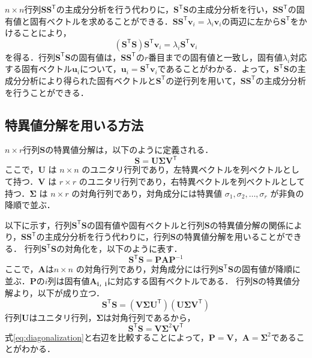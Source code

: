 \documentclass[a4j,12pt]{jreport}
\begin{document}
$n \times n$行列$\bm{S}\bm{S}^{\mathsf T}$の主成分分析を行う代わりに，$\bm{S}^{\mathsf T}\bm{S}$の主成分分析を行い，$\bm{S}\bm{S}^{\mathsf T}$の固有値と固有ベクトルを求めることができる．$\bm{S}\bm{S}^{\mathsf T}\bm{v}_i = \lambda_i\bm{v}_i$の両辺に左から$\bm{S}^{\mathsf T}$をかけることにより，
\[
	(\bm{S}^{\mathsf T}\bm{S})\bm{S}^{\mathsf T}\bm{v}_i = \lambda_i\bm{S}^{\mathsf T}\bm{v}_i
\]
を得る．行列$\bm{S}^{\mathsf T}\bm{S}$の固有値は，$\bm{S}\bm{S}^{\mathsf T}$の$r$番目までの固有値と一致し，固有値$\lambda_i$対応する固有ベクトル$\bm{u}_i$について，$\bm{u}_i = \bm{S}^{\mathsf T}\bm{v}_i$であることがわかる．よって，$\bm{S}^{\mathsf T}\bm{S}$の主成分分析により得られた固有ベクトルと$\bm{S}^{\mathsf T}$の逆行列を用いて，$\bm{S}\bm{S}^{\mathsf T}$の主成分分析を行うことができる．

\subsection{特異値分解を用いる方法}
$n \times r$行列$\bm{S}$の特異値分解は，以下のように定義される．
\[
\bm{S} = \bm{U} \bm{\Sigma} \bm{V}^{\mathsf T}
\]
ここで，\( \bm{U} \) は \( n \times n \) のユニタリ行列であり，左特異ベクトルを列ベクトルとして持つ．\( \bm{V} \) は \( r \times r \) のユニタリ行列であり，右特異ベクトルを列ベクトルとして持つ．\(\bm{ \Sigma }\) は \( n \times r \) の対角行列であり，対角成分には特異値 \( \sigma_1, \sigma_2, \dots, \sigma_r \) が非負の降順で並ぶ．

以下に示す，行列$\bm{S}^{\mathsf T}\bm{S}$の固有値や固有ベクトルと行列$\bm{S}$の特異値分解の関係により，$\bm{S}\bm{S}^{\mathsf T}$の主成分分析を行う代わりに，行列\(\bm{S}\)の特異値分解を用いることができる．
行列$\bm{S}^{\mathsf T}\bm{S}$の対角化を，以下のように表す．
\begin{equation}\label{eq:diagonalization}
	\bm{S}^{\mathsf T}\bm{S} = \bm{P}\bm{A}\bm{P}^{-1}
\end{equation}
ここで，\(\bm{A}\)は\( n \times n \) の対角行列であり，対角成分には行列$\bm{S}^{\mathsf T}\bm{S}$の固有値が降順に並ぶ．\(\bm{P}\)の\(i\)列は固有値\(\bm{A_{i，i}}\)に対応する固有ベクトルである．
行列\(\bm{S}\)の特異値分解より，以下が成り立つ．
\[
\bm{S}^{\mathsf T}\bm{S} = (\bm{V} \bm{\Sigma} \bm{U}^{\mathsf T})(\bm{U} \bm{\Sigma} \bm{V}^{\mathsf T})
\]
行列\(\bm{U}\)はユニタリ行列，\(\bm{\Sigma}\)は対角行列であるから，
\[
\bm{S}^{\mathsf T}\bm{S} = \bm{V}\bm{\Sigma}^2 \bm{V}^{\mathsf T}
\]
式\ref{eq:diagonalization}と右辺を比較することによって，\(\bm{P} = \bm{V} \)，\(\bm{A} = \bm{\Sigma}^2 \)であることがわかる．
\end{document}
